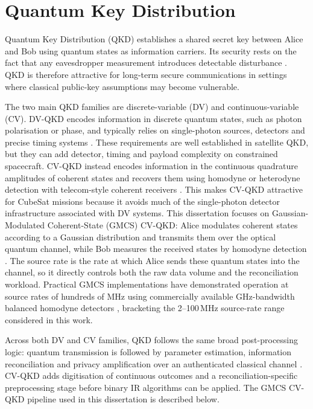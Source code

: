 \documentclass{UoYCSproject}
\begin{document}
\section{Quantum Key Distribution}
\label{sec:bg-qkd}

Quantum Key Distribution (QKD) establishes a shared secret key between Alice
and Bob using quantum states as information carriers. Its security rests on
the fact that any eavesdropper measurement introduces detectable disturbance
\cite{grosshans_continuous_2002, laudenbach_continuous-variable_2018}. QKD is
therefore attractive for long-term secure communications in settings where
classical public-key assumptions may become vulnerable.

The two main QKD families are discrete-variable (DV) and continuous-variable
(CV). DV-QKD encodes information in discrete quantum states, such as photon
polarisation or phase, and typically relies on single-photon sources, detectors
and precise timing systems \cite{bennett_quantum_1984, Gisin_2002}. These requirements are well established in
satellite QKD, but they can add detector, timing and payload complexity on
constrained spacecraft. CV-QKD instead encodes information in the continuous
quadrature amplitudes of coherent states and recovers them using homodyne or
heterodyne detection with telecom-style coherent receivers
\cite{laudenbach_continuous-variable_2018}. This makes CV-QKD attractive for
CubeSat missions because it avoids much of the single-photon detector
infrastructure associated with DV systems. This dissertation focuses on Gaussian-Modulated
Coherent-State (GMCS) CV-QKD: Alice modulates coherent states according to a
Gaussian distribution and transmits them over the optical quantum channel, while
Bob measures the received states by homodyne detection
\cite{grosshans_continuous_2002, grosshans_quantum_2003}. The source rate is
the rate at which Alice sends these quantum states into the channel, so it
directly controls both the raw data volume and the reconciliation workload.
Practical GMCS implementations have demonstrated operation at source rates of
hundreds of MHz using commercially available GHz-bandwidth balanced homodyne
detectors \cite{tang_performance_2020}, bracketing the 2--100\,MHz source-rate
range considered in this work.

Across both DV and CV families, QKD follows the same broad post-processing
logic: quantum transmission is followed by parameter estimation, information
reconciliation and privacy amplification over an authenticated classical
channel \cite{laudenbach_continuous-variable_2018, grosshans_quantum_2003}.
CV-QKD adds digitisation of continuous outcomes and a reconciliation-specific
preprocessing stage before binary IR algorithms can be applied. The GMCS
CV-QKD pipeline used in this dissertation is described below.
\end{document}
